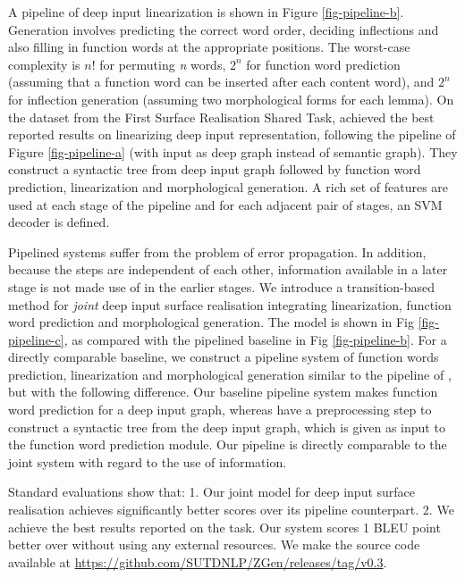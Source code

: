 \documentclass[11pt]{article}
\begin{document}
A pipeline of deep input linearization is shown in Figure \ref{fig-pipeline-b}. Generation involves predicting the correct word order, deciding inflections and also filling in function words at the appropriate positions. The worst-case complexity is $n!$ for permuting {\it n} words, $2^n$ for function word prediction (assuming that a function word can be inserted after each content word), and $2^n$ for inflection generation (assuming two morphological forms for each lemma). On the dataset from the First Surface Realisation Shared Task,  achieved the best reported results on linearizing deep input representation, following the pipeline of Figure \ref{fig-pipeline-a} (with input as deep graph instead of semantic graph). They construct a syntactic tree from deep input graph followed by function word prediction, linearization and morphological generation. A rich set of features are used at each stage of the pipeline and for each adjacent pair of stages, an SVM decoder is defined. 

Pipelined systems suffer from the problem of error propagation. In addition, because the steps are independent of each other, information available in a later stage is not made use of in the earlier stages. We introduce a transition-based \cite{J08-4003} method for {\it joint} deep input surface realisation integrating linearization, function word prediction and morphological generation. The model is shown in Fig \ref{fig-pipeline-c}, as compared with the pipelined baseline in Fig \ref{fig-pipeline-b}. For a directly comparable baseline, we construct a pipeline system of function words prediction, linearization and morphological generation similar to the pipeline of , but with the following difference. Our baseline pipeline system makes function word prediction for a deep input graph, whereas  have a preprocessing step to construct a syntactic tree from the deep input graph, which is given as input to the function word prediction module. Our pipeline is directly comparable to the joint system with regard to the use of information.

Standard evaluations show that: 1. Our joint model for deep input surface realisation achieves significantly better scores over its pipeline counterpart. 2. We achieve the best results reported on the task. Our system scores 1 BLEU point better over  without using any external resources. We make the source code available at \url{https://github.com/SUTDNLP/ZGen/releases/tag/v0.3}.
\end{document}
